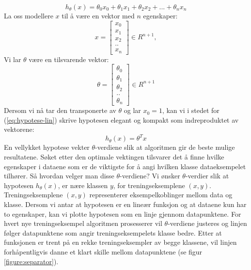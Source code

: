 \begin{equation}
h_\theta(x) = \theta_0x_0 + \theta_1x_1 + \theta_2x_2 + ... + \theta_nx_n
\label{eq:hypotese-lin}
\end{equation}
La oss modellere $x$ til å være en vektor med $n$ egenskaper: 
\[
x =
\begin{bmatrix}
x_0 \\
x_1 \\
x_2 \\
.. \\
x_{n}
\end{bmatrix}
\in R^{n+1},
\]
Vi lar $\theta$ være en tilsvarende vektor: 
\[
\theta =
\begin{bmatrix}
\theta_0 \\
\theta_1 \\
\theta_2 \\
.. \\
\theta_{n}
\end{bmatrix}
\in R^{n+1}
\]
Dersom vi nå tar den transponerte av $\theta$ og lar \(x_0 = 1\), kan vi i stedet for (\ref{eq:hypotese-lin}) skrive hypotesen elegant og kompakt som indreproduktet av vektorene:
\begin{equation}
h_\theta(x) = \theta^{T}x
\label{eq:hypotese-kompakt}
\end{equation}
En vellykket hypotese vekter $\theta$-verdiene slik at algoritmen gir de beste mulige resultatene. Søket etter den optimale vektingen tilsvarer det å finne hvilke egenskaper i dataene som er de viktigste for å angi hvilken klasse dataeksempelet tilhører. Så hvordan velger man disse $\theta$-verdiene? Vi ønsker $\theta$-verdier slik at hypotesen \(h_\theta(x)\), er nære klassen $y$, for treningseksemplene \((x,y)\). Treningseksemplene  \((x,y)\) representerer eksempelkoblinger mellom data og klasse. Dersom vi antar at hypotesen er en lineær funksjon og at dataene kun har to egenskaper, kan vi plotte hypotesen som en linje gjennom datapunktene. For hvert nye treningseksempel algoritmen prosesserer vil $\theta$-verdiene justeres og linjen følger datapunktene som angir treningseksempelets klasse bedre. Etter at funksjonen er trent på en rekke treningseksempler av begge klassene, vil linjen forhåpentligvis danne et klart skille mellom datapunktene (se figur \ref{figure:separator}).

